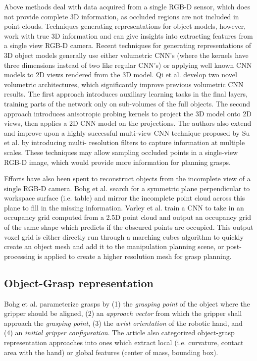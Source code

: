 Above methods deal with data acquired from a single RGB-D sensor, which does not provide complete 3D information, as
occluded regions are not included in point clouds. Techniques generating representations for object models, however,
work with true 3D information and can give insights into extracting features from a single view RGB-D camera. Recent
techniques for generating representations of 3D object models generally use either volumetric CNN's (where the kernels
have three dimensions instead of two like regular CNN's) or applying well known CNN models to 2D views rendered from the
3D model. Qi et al. \cite{Qi2016} develop two novel volumetric architectures, which significantly improve previous
volumetric CNN results. The first approach introduces auxiliary learning tasks in the final layers, training parts of
the network only on sub-volumes of the full objects. The second approach introduces anisotropic probing kernels to
project the 3D model onto 2D views, then applies a 2D CNN model on the projections. The authors also extend and improve
upon a highly successful multi-view CNN technique proposed by Su et al. \cite{Su2015} by introducing multi-
resolution filters to capture information at multiple scales. These techniques may allow sampling occluded points in a
single-view RGB-D image, which would provide more information for planning grasps.

Efforts have also been spent to reconstruct objects from the incomplete view of a single RGB-D camera. Bohg et al.
\cite{Bohg2011MindTheGap} search for a symmetric plane perpendicular to workspace surface (i.e. table) and mirror
the incomplete point cloud across this plane to fill in the missing information. Varley et al. \cite{Varley2017}
train a CNN to take in an occupancy grid computed from a 2.5D point cloud and output an occupancy grid of the same shape
which predicts if the obscured points are occupied. This output voxel grid is either directly run through a marching
cubes algorithm to quickly create an object mesh and add it to the manipulation planning scene, or post-processing
is applied to create a higher resolution mesh for grasp planning.

\subsection{Object-Grasp representation}
Bohg et al. \cite{Bohg2014} parameterize grasps by (1) the \emph{grasping point} of the object where the gripper
should be aligned, (2) an \emph{approach vector} from which the gripper shall approach the \emph{grasping point},
(3) the \emph{wrist orientation} of the robotic hand, and (4) an \emph{initial gripper configuration}.
The article also categorized object-grasp representation approaches into ones which extract local (i.e. curvature,
contact area with the hand) or global features (center of mass, bounding box).

